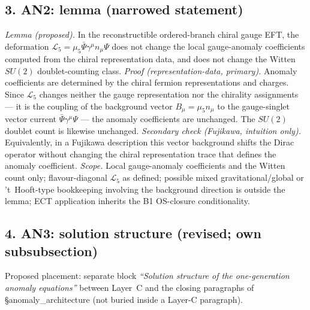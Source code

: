 \subsection*{3. AN2: lemma (narrowed statement)}
\emph{Lemma (proposed).}
In the reconstructible ordered-branch chiral gauge EFT, the
deformation $\mathcal L_5=\mu_5\bar\Psi\gamma^\mu n_\mu\Psi$ does
not change the local gauge-anomaly coefficients computed from the
chiral representation data, and does not change the Witten $SU(2)$
doublet-counting class.
\emph{Proof (representation-data, primary).}
Anomaly coefficients are determined by the chiral fermion
representations and charges.
Since $\mathcal L_5$ changes neither the gauge representation nor
the chirality assignments --- it is the coupling of the background
vector $B_\mu=\mu_5 n_\mu$ to the gauge-singlet vector current
$\bar\Psi\gamma^\mu\Psi$ --- the anomaly coefficients are unchanged.
The $SU(2)$ doublet count is likewise unchanged.
\emph{Secondary check (Fujikawa, intuition only).}
Equivalently, in a Fujikawa description this vector background
shifts the Dirac operator without changing the chiral
representation trace that defines the anomaly coefficient.
\emph{Scope.}
Local gauge-anomaly coefficients and the Witten count only;
flavour-diagonal $\mathcal L_5$ as defined; possible mixed
gravitational/global or 't~Hooft-type bookkeeping involving the
background direction is outside the lemma; ECT application inherits
the B1 OS-closure conditionality.

\subsection*{4. AN3: solution structure (revised; own subsubsection)}
Proposed placement: separate block
\emph{``Solution structure of the one-generation anomaly
equations''} between Layer~C and the closing paragraphs of
\S anomaly\_architecture (not buried inside a Layer-C paragraph).


